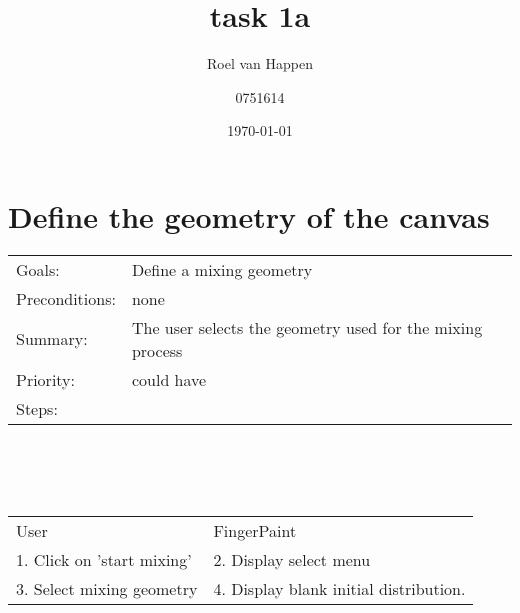 \documentclass[a4paper,twoside,11pt]{article}
\begin{document}
\title{task 1a}
\author{Roel van Happen \and 0751614}
\date{\today}
\maketitle
\section*{Define the geometry of the canvas}
\begin{tabular}{ll}

 Goals: & Define a mixing geometry \\
 Preconditions: & none \\
 Summary: & The user selects the geometry used for the mixing process \\
 Priority: & could have \\
 Steps: & \\
\end{tabular} \\
\ \\ \ \\
\begin{tabular}{ll}
 User                       & FingerPaint                            \\
 1. Click on 'start mixing' & 2. Display select menu                 \\
 3. Select mixing geometry  & 4. Display blank initial distribution. \\
\end{tabular}
\end{document}

